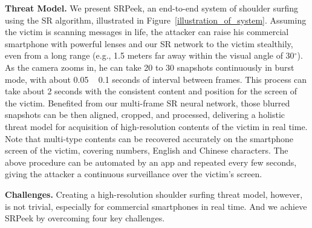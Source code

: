 \vspace{1mm}
\noindent
\textbf{Threat Model.} We present \textsf{SRPeek}, an end-to-end system of shoulder surfing using the SR algorithm, illustrated in Figure~\ref{illustration_of_system}. 
Assuming the victim is scanning messages in life, the attacker can raise his commercial smartphone with powerful lenses and our SR network to the victim stealthily, even from a long range (e.g., 1.5 meters far away within the visual angle of 30$^{\circ}$). As the camera zooms in, he can take 20 to 30 snapshots continuously in burst mode, with about 0.05 ~ 0.1 seconds of interval between frames. This process can take about 2 seconds with the consistent content and position for the screen of the victim. Benefited from our multi-frame SR neural network, those blurred snapshots can be then aligned, cropped, and processed, delivering a holistic threat model for acquisition of high-resolution contents of the victim in real time. Note that multi-type contents can be recovered accurately on the smartphone screen of the victim, covering numbers, English and Chinese characters. The above procedure can be automated by an app and repeated every few seconds, giving the attacker a continuous surveillance over the victim's screen.

\vspace{1mm}
\noindent
\textbf{Challenges.} Creating a high-resolution shoulder surfing threat model, however, is not trivial, especially for commercial smartphones in real time. And we achieve \textsf{SRPeek} by overcoming four key challenges.


